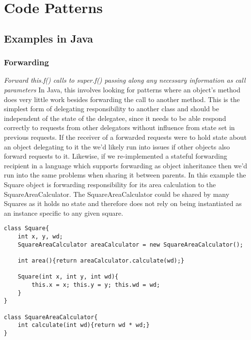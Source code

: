 \chapter{Code Patterns}\label{C:bg}

\section{Examples in Java}
\subsection{Forwarding}
\textit{Forward this.f() calls to super.f() passing along any necessary information as call parameters} \newline\newline
In Java, this involves looking for patterns where an object’s method does very little work besides forwarding the call to another method. This is the simplest form of delegating responsibility to another class and should be independent of the state of the delegatee, since it needs to be able respond correctly to requests from other delegators without influence from state set in previous requests.\newline 
If the receiver of a forwarded requests were to hold state about an object delegating to it the we’d likely run into issues if other objects also forward requests to it. Likewise, if we re-implemented a stateful forwarding recipient in a language which supports forwarding as object inheritance then we’d run into the same problems when sharing it between parents.\newline
In this example the Square object is forwarding responsibility for its area calculation to the SquareAreaCalculator. The SquareAreaCalculator could be shared by many Squares as it holds no state and therefore does not rely on being instantiated as an instance specific to any given square.

\begin{lstlisting}
class Square{
	int x, y, wd;
	SquareAreaCalculator areaCalculator = new SquareAreaCalculator();
	
	int area(){return areaCalculator.calculate(wd);}
	
	Square(int x, int y, int wd){
		this.x = x; this.y = y; this.wd = wd;
	}
}

class SquareAreaCalculator{
	int calculate(int wd){return wd * wd;}
}
\end{lstlisting}


